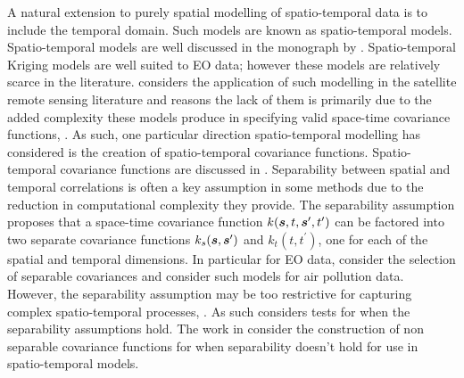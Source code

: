 A natural extension to purely spatial modelling of spatio-temporal data is to include the temporal domain.
Such models are known as spatio-temporal models.
Spatio-temporal models are well discussed in the monograph \cite{cressie_statistics_2011} by \citeauthor{cressie_statistics_2011}.
Spatio-temporal Kriging models are well suited to EO data; however these models are relatively scarce in the literature.
\citeauthor{militino_introduction_2018} considers the application of such modelling in the satellite remote sensing literature and reasons the lack of them is primarily due to the added complexity these models produce in specifying valid space-time covariance functions, \cite{militino_introduction_2018}.
As such, one particular direction spatio-temporal modelling has considered is the creation of spatio-temporal covariance functions.
Spatio-temporal covariance functions are discussed in \citep{cressie_statistics_2011}.
Separability between spatial and temporal correlations is often a key assumption in some methods due to the reduction in computational complexity they provide.
The separability assumption proposes that a space-time covariance function $k(\bm{{s}}, t, \bm{{s}}^\prime, t^\prime)$ can be factored into two separate covariance functions $k_{s}(\bm{{s}}, \bm{{s}}^\prime)$ and $k_t(t, t^\prime)$, one for each of the spatial and temporal dimensions. 
In particular for EO data, \cite{george_selecting_2015} consider the selection of separable covariances and \cite{deb_spatio-temporal_2019} consider such models for air pollution data. 
However, the separability assumption may be too restrictive for capturing complex spatio-temporal processes, \citep{cressie_statistics_2011}. 
As such \citep{mitchell_likelihood_2006, fuentes_testing_2006, aston_tests_2017} considers tests for when the separability assumptions hold.
The work in \citep{cressie_classes_1999, gneiting_nonseparable_2002, iaco_nonseparable_2002} consider the construction of non separable covariance functions for when separability doesn't hold for use in spatio-temporal models.

